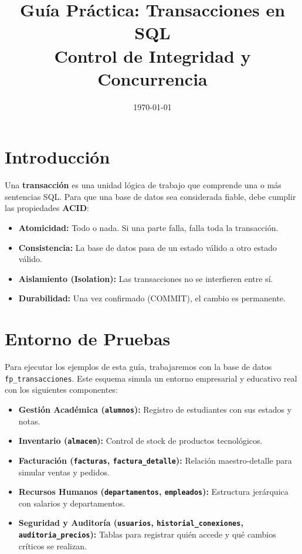 \documentclass[12pt,a4paper]{article}
\title{\textbf{Guía Práctica: Transacciones en SQL}\\ \large Control de Integridad y Concurrencia}
\author{}
\date{\today}
\begin{document}
\maketitle

\section{Introducción}
Una \textbf{transacción} es una unidad lógica de trabajo que comprende una o más sentencias SQL. Para que una base de datos sea considerada fiable, debe cumplir las propiedades \textbf{ACID}:
\begin{itemize}
    \item \textbf{Atomicidad:} Todo o nada. Si una parte falla, falla toda la transacción.
    \item \textbf{Consistencia:} La base de datos pasa de un estado válido a otro estado válido.
    \item \textbf{Aislamiento (Isolation):} Las transacciones no se interfieren entre sí.
    \item \textbf{Durabilidad:} Una vez confirmado (COMMIT), el cambio es permanente.
\end{itemize}

\section{Entorno de Pruebas}
Para ejecutar los ejemplos de esta guía, trabajaremos con la base de datos \texttt{fp\_transacciones}. Este esquema simula un entorno empresarial y educativo real con los siguientes componentes:

\begin{itemize}
    \item \textbf{Gestión Académica (\texttt{alumnos}):} Registro de estudiantes con sus estados y notas.
    \item \textbf{Inventario (\texttt{almacen}):} Control de stock de productos tecnológicos.
    \item \textbf{Facturación (\texttt{facturas}, \texttt{factura\_detalle}):} Relación maestro-detalle para simular ventas y pedidos.
    \item \textbf{Recursos Humanos (\texttt{departamentos}, \texttt{empleados}):} Estructura jerárquica con salarios y departamentos.
    \item \textbf{Seguridad y Auditoría (\texttt{usuarios}, \texttt{historial\_conexiones}, \texttt{auditoria\_precios}):} Tablas para registrar quién accede y qué cambios críticos se realizan.
\end{itemize}
\end{document}
